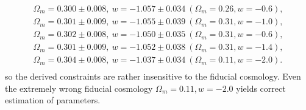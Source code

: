 \documentclass[useAMS,usenatbib]{mnras}
\begin{document}
\begin{eqnarray}
\Omega_m = 0.300 \pm 0.008,\ w=-1.057\pm 0.034\ (\Omega_m=0.26, w=-0.6),\\    
\Omega_m = 0.301 \pm 0.009,\ w=-1.055\pm 0.039\ (\Omega_m=0.31, w=-1.0),\\
\Omega_m = 0.302 \pm 0.008,\ w=-1.050\pm 0.035\ (\Omega_m=0.31, w=-0.6),\\    
\Omega_m = 0.301 \pm 0.009,\ w=-1.052\pm 0.038\ (\Omega_m=0.31, w=-1.4),\\    
\Omega_m = 0.304 \pm 0.008,\ w=-1.037\pm 0.034\ (\Omega_m=0.11, w=-2.0).\\    
% 
\end{eqnarray}
so the derived constraints are rather insensitive to the fiducial cosmology.
Even the extremely wrong fiducial cosmology $\Omega_m=0.11, w=-2.0$ yields correct estimation of parameters.
\end{document}
